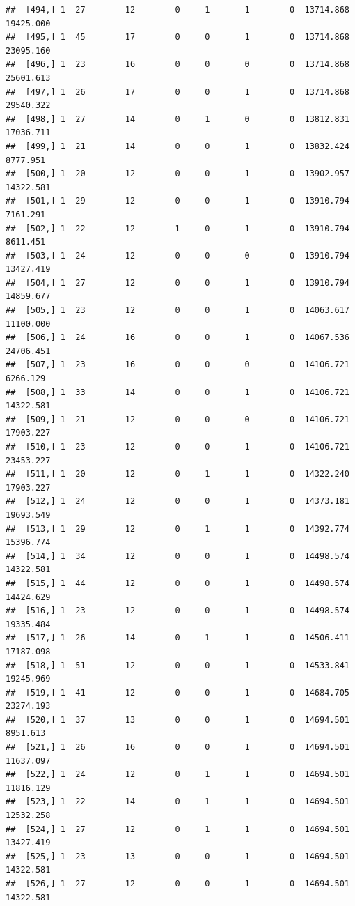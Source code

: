 \documentclass[
]{article}
\begin{document}
\begin{verbatim}
##  [494,] 1  27        12        0     1       1        0  13714.868  19425.000
##  [495,] 1  45        17        0     0       1        0  13714.868  23095.160
##  [496,] 1  23        16        0     0       0        0  13714.868  25601.613
##  [497,] 1  26        17        0     0       1        0  13714.868  29540.322
##  [498,] 1  27        14        0     1       0        0  13812.831  17036.711
##  [499,] 1  21        14        0     0       1        0  13832.424   8777.951
##  [500,] 1  20        12        0     0       1        0  13902.957  14322.581
##  [501,] 1  29        12        0     0       1        0  13910.794   7161.291
##  [502,] 1  22        12        1     0       1        0  13910.794   8611.451
##  [503,] 1  24        12        0     0       0        0  13910.794  13427.419
##  [504,] 1  27        12        0     0       1        0  13910.794  14859.677
##  [505,] 1  23        12        0     0       1        0  14063.617  11100.000
##  [506,] 1  24        16        0     0       1        0  14067.536  24706.451
##  [507,] 1  23        16        0     0       0        0  14106.721   6266.129
##  [508,] 1  33        14        0     0       1        0  14106.721  14322.581
##  [509,] 1  21        12        0     0       0        0  14106.721  17903.227
##  [510,] 1  23        12        0     0       1        0  14106.721  23453.227
##  [511,] 1  20        12        0     1       1        0  14322.240  17903.227
##  [512,] 1  24        12        0     0       1        0  14373.181  19693.549
##  [513,] 1  29        12        0     1       1        0  14392.774  15396.774
##  [514,] 1  34        12        0     0       1        0  14498.574  14322.581
##  [515,] 1  44        12        0     0       1        0  14498.574  14424.629
##  [516,] 1  23        12        0     0       1        0  14498.574  19335.484
##  [517,] 1  26        14        0     1       1        0  14506.411  17187.098
##  [518,] 1  51        12        0     0       1        0  14533.841  19245.969
##  [519,] 1  41        12        0     0       1        0  14684.705  23274.193
##  [520,] 1  37        13        0     0       1        0  14694.501   8951.613
##  [521,] 1  26        16        0     0       1        0  14694.501  11637.097
##  [522,] 1  24        12        0     1       1        0  14694.501  11816.129
##  [523,] 1  22        14        0     1       1        0  14694.501  12532.258
##  [524,] 1  27        12        0     1       1        0  14694.501  13427.419
##  [525,] 1  23        13        0     0       1        0  14694.501  14322.581
##  [526,] 1  27        12        0     0       1        0  14694.501  14322.581

\end{verbatim}
\end{document}
